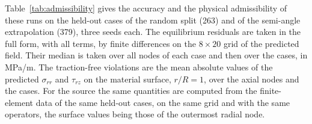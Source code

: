 \documentclass[subscriptcorrection,upint,varvw,barcolor=Goldenrod3,mathalfa=cal=euler,balance,hyphenate,french,pdf-a]{asmejour} %
\begin{document}
Table~\ref{tab:admissibility} gives the accuracy and the physical admissibility of these runs on the held-out cases of the random split (263) and of the semi-angle extrapolation (379), three seeds each. The equilibrium residuals are taken in the full form, with all terms, by finite differences on the $8\times20$ grid of the predicted field. Their median is taken over all nodes of each case and then over the cases, in MPa/m. The traction-free violations are the mean absolute values of the predicted $\sigma_{rr}$ and $\tau_{rz}$ on the material surface, $r/R=1$, over the axial nodes and the cases. For the source the same quantities are computed from the finite-element data of the same held-out cases, on the same grid and with the same operators, the surface values being those of the outermost radial node. %
\end{document}
